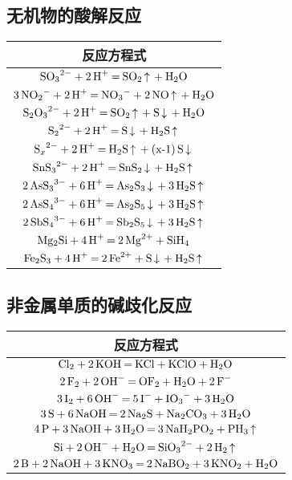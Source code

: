\documentclass[
  10pt,
  twoside,
  openany,
  b5paper, %
  colorscheme = basic, %
  xits = false,
]{qyxf-book}
\begin{document}
\subsection{无机物的酸解反应}

\begin{table}[htbp]
	\centering
	\begin{tabular}{c}
	\toprule
		反应方程式  \\
	\midrule
		\qquad \qquad $\ce{SO3^2- + 2H+ = SO2 ^ + H2O}$ \qquad\qquad \\
		\qquad\qquad $\ce{3NO_2- + 2H+ = NO3^- + 2NO ^ + H2O}$ \qquad\qquad\\
		\qquad\qquad $\ce{S2O3^2- + 2H+ = SO2 ^ + S v + H2O}$ \qquad\qquad \\  \qquad\qquad $\ce{S2^2- + 2H+ = S v + H2S ^}$ \qquad\qquad \\
		\qquad\qquad $\ce{S_x^2- + 2H+ = H2S ^ + (x-1)S v }$\qquad\qquad \\  \qquad\qquad$\ce{SnS3^2- + 2H+ = SnS2 v + H2S ^}$ \qquad\qquad \\
		\qquad\qquad $\ce{2AsS3^3- + 6H+ = As2S3 v + 3H2S ^ }$ \qquad\qquad \\   \qquad\qquad $\ce{2AsS4^3- + 6H+ = As2S5 v + 3H2S ^}$ \qquad\qquad \\
		\qquad\qquad $\ce{2SbS4^3- + 6H+ = Sb2S5 v + 3H2S ^}$\qquad\qquad\\
		\qquad\qquad $\ce{Mg2Si + 4H+ = 2Mg^2+ + SiH4}$ \qquad\qquad \\
		\qquad\qquad $\ce{Fe2S3 + 4H+ = 2Fe^2+ + S v + H2S ^}$\qquad\qquad\\
	\bottomrule
	\end{tabular}
\end{table}

\subsection{非金属单质的碱歧化反应}
\begin{table}[htbp]
	\centering
	\begin{tabular}{c}
		\toprule
		反应方程式  \\
		\midrule
		\qquad \qquad $\ce{Cl2 + 2KOH = KCl + KClO + H2O}$ \qquad\qquad \\
		\qquad\qquad $\ce{2F2 + 2OH- = OF2 + H2O + 2F-}$ \qquad\qquad\\
		\qquad\qquad $\ce{3I2 + 6OH- = 5I- + IO3^- + 3H2O}$ \qquad\qquad \\  \qquad\qquad $\ce{3S + 6NaOH = 2Na2S + Na2CO3 + 3H2O}$ \qquad\qquad \\
		\qquad\qquad $\ce{4P + 3NaOH + 3H2O = 3NaH2PO2 + PH3 ^}$\qquad\qquad \\  \qquad\qquad$\ce{Si + 2OH- + H2O = SiO3^2- + 2H2 ^}$ \qquad\qquad \\
		\qquad\qquad $\ce{2B + 2NaOH + 3KNO3 = 2NaBO2 + 3KNO2 + H2O}$ \qquad\qquad \\   
		\bottomrule
	\end{tabular}
\end{table}
\end{document}
